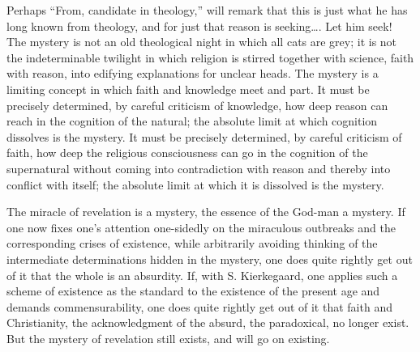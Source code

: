 \documentclass[12pt,a4paper,openany]{book}
\newcommand{\opage}[1]{\marginnote{\footnotesize\textit{[#1]}}}
\begin{document}
Perhaps ``From, candidate in theology,'' will remark that this is
just what he has long known from theology, and for just that reason is
seeking\dots{}. Let him seek! The mystery is not an old theological night
in which all cats are grey; it is not the indeterminable twilight in
which religion is stirred together with science, faith with reason, into
edifying explanations for unclear heads. The mystery is a limiting
concept in which faith and knowledge meet and part. It must be precisely
determined, by careful criticism of knowledge, how deep reason can reach
in the cognition of the natural; the absolute limit at which cognition
dissolves is the mystery. It must be precisely determined, by careful
criticism of faith, how deep the religious consciousness can go in the
cognition of the supernatural without coming into contradiction with
reason and thereby into conflict with itself; the absolute limit at
which it is dissolved is the mystery.

\opage{82}The miracle of revelation is a mystery, the essence of the God-man a
mystery. If one now fixes one's attention one-sidedly on the miraculous
outbreaks and the corresponding crises of existence, while arbitrarily
avoiding thinking of the intermediate determinations hidden in the
mystery, one does quite rightly get out of it that the whole is an
absurdity. If, with S. Kierkegaard, one applies such a scheme of
existence as the standard to the existence of the present age and demands
commensurability, one does quite rightly get out of it that faith and
Christianity, the acknowledgment of the absurd, the paradoxical, no
longer exist. But the mystery of revelation still exists, and will go on
existing.
\end{document}
